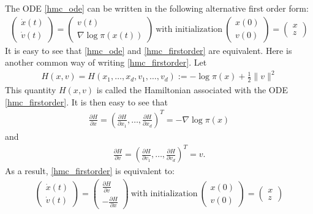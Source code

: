 \documentclass{scrartcl}
\begin{document}
The ODE \eqref{hmc_ode} can be written in the following alternative
first order form:
\begin{align}\label{hmc_firstorder}
  \begin{pmatrix}
    \dot{x}(t) \\ \dot{v}(t)
  \end{pmatrix} =
  \begin{pmatrix}
    v(t) \\ \nabla \log \pi(x(t)) 
  \end{pmatrix} ~\text{with initialization}~
  \begin{pmatrix}
    x(0) \\ v(0)
  \end{pmatrix} =
  \begin{pmatrix}
    x \\ z
  \end{pmatrix}
\end{align}
It is easy to see that \eqref{hmc_ode} and \eqref{hmc_firstorder} are
equivalent. Here is another common way of writing
\eqref{hmc_firstorder}. Let
\begin{align}\label{hamiltonian}
  H(x, v) = H(x_1, \dots, x_d, v_1, \dots, v_d) := -\log \pi(x) +
  \frac{1}{2}\|v\|^2 
\end{align}
This quantity $H(x, v)$ is called the Hamiltonian associated with the
ODE \eqref{hmc_firstorder}. It is then easy to see that
\begin{align*}
  \frac{\partial H}{\partial x} = \left(\frac{\partial H}{\partial
  x_1}, \dots, \frac{\partial H}{\partial x_d} \right)^T = -\nabla
  \log \pi(x)
\end{align*}
and
\begin{align*}
  \frac{\partial H}{\partial v} = \left(\frac{\partial H}{\partial
  v_1}, \dots, \frac{\partial H}{\partial v_d} \right)^T = v. 
\end{align*}
As a result, \eqref{hmc_firstorder} is equivalent to:
\begin{align}\label{hmc_form}
    \begin{pmatrix}
    \dot{x}(t) \\ \dot{v}(t)
  \end{pmatrix} =
  \begin{pmatrix}
    \frac{\partial H}{\partial v} \\ -\frac{\partial H}{\partial x}
  \end{pmatrix} ~\text{with initialization}~
  \begin{pmatrix}
    x(0) \\ v(0)
  \end{pmatrix} =
  \begin{pmatrix}
    x \\ z
  \end{pmatrix}
\end{align}
\end{document}
